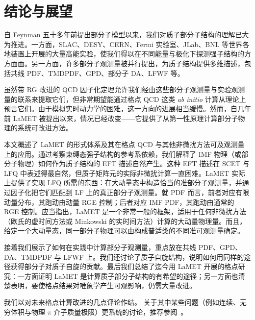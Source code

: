\section{结论与展望}
\label{sec:conclusion}

自 Feynman 五十多年前提出部分子模型以来，我们对质子部分子结构的理解已大为推进。一方面，SLAC、DESY、CERN、Fermi 实验室、JLab、BNL 等世界各地装置上开展的大量高能实验，使我们得以在不同能量与极化下探测强子结构的方方面面。另一方面，许多部分子观测量被并行提出，为质子结构提供多维描述，包括共线 PDF、TMDPDF、GPD、部分子 DA、LFWF 等。

虽然带 RG 改进的 QCD 因子化定理允许我们经由这些部分子观测量与实验观测量的联系来提取它们，但非常期望能通过格点 QCD 这类 {\it ab initio} 计算从理论上预言它们。由于模拟实时动力学的困难，这一方向的进展相当缓慢。然而，自几年前 LaMET 被提出以来，情况已经改变——它提供了从第一性原理计算部分子物理的系统可改进方法。

本文概述了 LaMET 的形式体系及其在格点 QCD 与其他非微扰方法可及观测量上的应用。通过考察束缚态强子结构的参考系依赖，我们解释了 IMF 物理（或部分子物理）如何作为质子结构的 EFT 描述自然产生。这种 EFT 描述在 SCET 与 LFQ 中表述得最自然，但质子矩阵元的实际非微扰计算一直困难。LaMET 实际上提供了实现 LFQ 所需的东西：在大动量态中构造恰当的准部分子观测量，并通过因子化把它们匹配到 LF 上的真正部分子观测量。就 PDF 而言，前者对应有限动量分布，其跑动由动量 RGE 控制；后者对应 IMF PDF，其跑动由通常的 RGE 控制。应当指出，LaMET 是一个非常一般的框架，适用于任何非微扰方法（欧氏的虚时间方法或 Minkowski 的实时间方法）计算的大动量物理量。而且，给定一个大动量态，同一部分子物理可以由构成普适类的不同准可观测量确定。

接着我们展示了如何在实践中计算部分子观测量，重点放在共线 PDF、GPD、DA、TMDPDF 与 LFWF 上。我们还讨论了质子自旋结构，说明如何用同样的途径获得部分子对质子自旋的贡献。最后我们总结了迄今用 LaMET 开展的格点研究：一方面证明 LaMET 是计算质子部分子结构的有希望的途径；另一方面也清楚表明，要使格点结果对唯象学产生可观影响，仍需大量改进。

我们以对未来格点计算改进的几点评论作结。
%
关于其中某些问题（例如连续、无穷体积与物理 $\pi$ 介子质量极限）更系统的讨论，推荐参阅~\cite{Alexandrou:2019lfo}。


